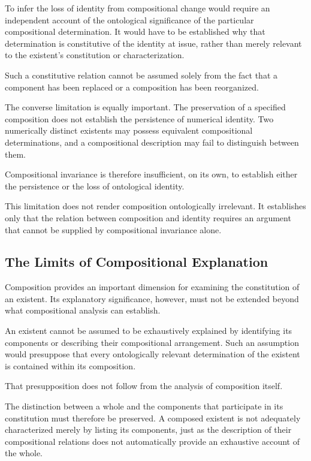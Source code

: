 To infer the loss of identity from compositional change
would require an independent account of the ontological
significance of the particular compositional determination.
It would have to be established why that determination
is constitutive of the identity at issue, rather than
merely relevant to the existent's constitution or
characterization.

Such a constitutive relation cannot be assumed solely
from the fact that a component has been replaced or
a composition has been reorganized.

The converse limitation is equally important. The
preservation of a specified composition does not establish
the persistence of numerical identity. Two numerically
distinct existents may possess equivalent compositional
determinations, and a compositional description may
fail to distinguish between them.

Compositional invariance is therefore insufficient,
on its own, to establish either the persistence or
the loss of ontological identity.

This limitation does not render composition ontologically
irrelevant. It establishes only that the relation between
composition and identity requires an argument that
cannot be supplied by compositional invariance alone.

\subsection{The Limits of Compositional Explanation}

Composition provides an important dimension for examining
the constitution of an existent. Its explanatory significance,
however, must not be extended beyond what compositional
analysis can establish.

An existent cannot be assumed to be exhaustively explained
by identifying its components or describing their
compositional arrangement. Such an assumption would
presuppose that every ontologically relevant determination
of the existent is contained within its composition.

That presupposition does not follow from the analysis
of composition itself.

The distinction between a whole and the components
that participate in its constitution must therefore
be preserved. A composed existent is not adequately
characterized merely by listing its components, just
as the description of their compositional relations
does not automatically provide an exhaustive account
of the whole.

